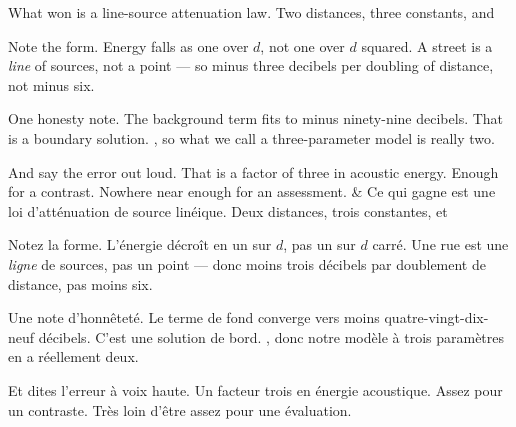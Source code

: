 \documentclass[10pt,a4paper]{article}
\begin{document}
\begin{say}
What won is a line-source attenuation law. Two distances, three constants, and

Note the form. Energy falls as one over $d$, not one over $d$ squared. A street is
a \emph{line} of sources, not a point --- so minus three decibels per doubling of
distance, not minus six.

One honesty note. The background term fits to minus ninety-nine decibels. That is
a boundary solution. , so
what we call a three-parameter model is really two.

And say the error out loud.  That is a factor of three in acoustic energy. Enough for a contrast.
Nowhere near enough for an assessment.
&
Ce qui gagne est une loi d'atténuation de source linéique. Deux distances, trois
constantes, et 

Notez la forme. L'énergie décroît en un sur $d$, pas un sur $d$ carré. Une rue est
une \emph{ligne} de sources, pas un point --- donc moins trois décibels par
doublement de distance, pas moins six.

Une note d'honnêteté. Le terme de fond converge vers moins quatre-vingt-dix-neuf
décibels. C'est une solution de bord. , donc notre modèle à trois paramètres en a réellement deux.

Et dites l'erreur à voix haute.  Un facteur trois en énergie acoustique. Assez pour un contraste. Très
loin d'être assez pour une évaluation.
\end{say}
\end{document}
